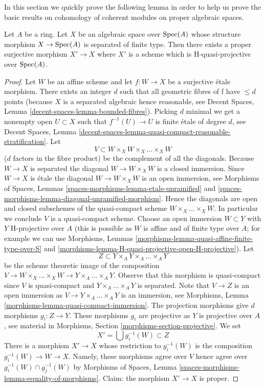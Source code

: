 \noindent
In this section we quickly prove the following lemma in order
to help us prove the basic results on cohomology of coherent
modules on proper algebraic spaces.

\begin{lemma}
\label{lemma-weak-chow}
Let $A$ be a ring. Let $X$ be an algebraic space over $\mathop{\mathrm{Spec}}(A)$
whose structure morphism $X \to \mathop{\mathrm{Spec}}(A)$ is separated of finite type.
Then there exists a proper surjective morphism $X' \to X$
where $X'$ is a scheme which is H-quasi-projective over $\mathop{\mathrm{Spec}}(A)$.
\end{lemma}

\begin{proof}
Let $W$ be an affine scheme and let $f : W \to X$ be a surjective
\'etale morphism. There exists an integer $d$ such that all geometric
fibres of f have $\leq d$ points (because $X$ is a separated algebraic
hence reasonable, see
Decent Spaces, Lemma \ref{decent-spaces-lemma-bounded-fibres}).
Picking $d$ minimal we get a nonempty open $U \subset X$ such that
$f^{-1}(U) \to U$ is finite \'etale of degree $d$, see
Decent Spaces, Lemma
\ref{decent-spaces-lemma-quasi-compact-reasonable-stratification}.
Let
$$
V \subset W \times_X W \times_X \ldots \times_X W
$$
($d$ factors in the fibre product) be the complement of all the diagonals.
Because $W \to X$ is separated the diagonal $W \to W \times_X W$ is a
closed immersion. Since $W \to X$ is \'etale the diagonal
$W \to W \times_X W$ is an open immersion, see
Morphisms of Spaces, Lemmas
\ref{spaces-morphisms-lemma-etale-unramified} and
\ref{spaces-morphisms-lemma-diagonal-unramified-morphism}.
Hence the diagonals are open and closed subschemes
of the quasi-compact scheme $W \times_X \ldots \times_X W$.
In particular we conclude $V$ is a quasi-compact scheme.
Choose an open immersion $W \subset Y$ with $Y$ H-projective over
$A$ (this is possible as $W$ is affine and of finite type over $A$;
for example we can use
Morphisms, Lemmas
\ref{morphisms-lemma-quasi-affine-finite-type-over-S} and
\ref{morphisms-lemma-H-quasi-projective-open-H-projective}).
Let
$$
Z \subset Y \times_A Y \times_A \ldots \times_A Y
$$
be the scheme theoretic image of the composition
$V \to W \times_X \ldots \times_X W \to Y \times_A \ldots \times_A Y$.
Observe that this morphism is quasi-compact since $V$ is quasi-compact
and $Y \times_A \ldots \times_A Y$ is separated.
Note that $V \to Z$ is an open immersion as
$V \to Y \times_A \ldots \times_A Y$ is an immersion, see
Morphisms, Lemma \ref{morphisms-lemma-quasi-compact-immersion}.
The projection morphisms give $d$ morphisms $g_i : Z \to Y$.
These morphisms $g_i$ are projective as $Y$ is projective over $A$, see
material in Morphisms, Section \ref{morphisms-section-projective}.
We set
$$
X' = \bigcup g_i^{-1}(W) \subset Z
$$
There is a morphism $X' \to X$ whose restriction to $g_i^{-1}(W)$ is
the composition $g_i^{-1}(W) \to W \to X$.
Namely, these morphisms agree over $V$ hence agree over
$g_i^{-1}(W) \cap g_j^{-1}(W)$ by
Morphisms of Spaces, Lemma \ref{spaces-morphisms-lemma-equality-of-morphisms}.
Claim: the morphism $X' \to X$ is proper.


\end{proof}
